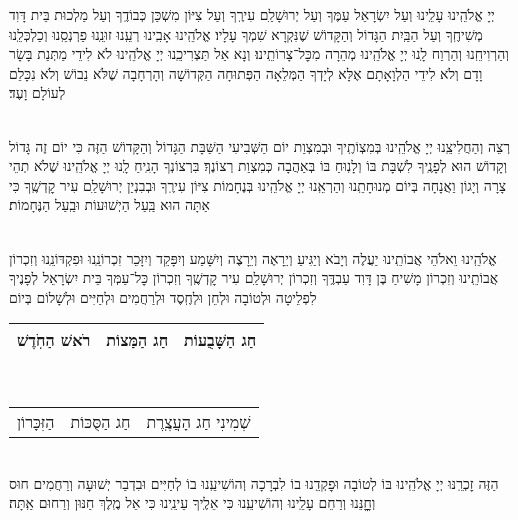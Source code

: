 \documentclass[twoside, openany, parskip=half, 11pt]{book}
\begin{document}
יְיָ אֱלֹהֵֽינוּ עָלֵֽינוּ וְעַל יִשְׂרָאֵל עַמֶּךָ וְעַל יְרוּשָׁלַ‍ִם עִירֶֽךָ וְעַל צִיּוֹן מִשְׁכַּן כְּבוֹדֶֽךָ וְעַל מַלְכוּת בֵּית דָּוִד מְשִׁיחֶֽךָ וְעַל הַבַּֽיִת הַגָּדוֹל וְהַקָּדוֹשׁ שֶׁנִּקְרָא שִׁמְךָ עָלָיו׃ אֱלֹהֵֽינוּ אָבִֽינוּ רְעֵֽנוּ זוּנֵֽנוּ פַרְנְסֵֽנוּ וְכַלְכְּלֵֽנוּ וְהַרְוִיחֵֽנוּ וְהַרְוַח לָֽנוּ יְיָ אֱלֹהֵֽינוּ מְהֵרָה מִכׇּל־צָרוֹתֵֽינוּ׃ וְנָא אַל תַּצְרִיכֵֽנוּ יְיָ אֱלֹהֵֽינוּ לֹא לִידֵי מַתְּנַת בָּשָׂר וָדָם וְלֹא לִידֵי הַלְוָאָתָם אֶלָּא לְיָדְךָ הַמְּלֵאָה הַפְּתוּחָה הַקְּדוֹשָׁה וְהָרְחָבָה שֶׁלֹּא נֵבוֹשׁ וְלֹא נִכָּלֵם לְעוֹלָם וָעֶד׃

\enlargethispage{\baselineskip}

\vspace{-.25\baselineskip}
\begin{sometimes}

\shabbos\\
רְצֵה וְהַחֲלִיצֵֽנוּ יְיָ אֱלֹהֵֽינוּ בְּמִצְוֹתֶֽיךָ וּבְמִצְוַת יוֹם הַשְּׁבִיעִי הַשַּׁבָּת הַגָּדוֹל וְהַקָּדוֹשׁ הַזֶּה כִּי יוֹם זֶה גָּדוֹל וְקָדוֹשׁ הוּא לְפָנֶֽיךָ לִשְׁבָּת בּוֹ וְלָנֽוּחַ בּוֹ בְּאַהֲבָה כְּמִצְוַת רְצוֹנֶךָ׃ בִּרְצוֹנְךָ הָנִֽיחַ לָֽנוּ יְיָ אֱלֹהֵֽינוּ שֶׁלֹא תְהֵי צָרָה וְיָגוֹן וַאֲנָחָה בְּיוֹם מְנוּחָתֵֽנוּ וְהַרְאֵֽנוּ יְיָ אֱלֹהֵֽינוּ בְּנֶחָמוֹת צִיּוֹן עִירֶֽךָ וּבְבִנְיַן יְרוּשָׁלַ‍ִם עִיר קׇדְשֶֽׁךָ כִּי אַתָּה הוּא בַּֽעַל הַיְשׁוּעוֹת וּבַֽעַל הַנֶּחָמוֹת׃


\sepline %

\vspace{-.25\baselineskip}
\\
אֱלֹהֵֽינוּ וֵאלֹהֵי אֲבוֹתֵֽינוּ יַעֲלֶה וְיָבֹא וְיַגִּיעַ וְיֵרָאֶה וְיֵרָצֶה וְיִשָּׁמַע וְיִפָּקֵד וְיִזָּכֵר זִכְרוֹנֵֽנוּ וּפִקְדּוֹנֵֽנוּ וְזִכְרוֹן אֲבוֹתֵֽינוּ וְזִכְרוֹן מָשִׁיחַ בֶּן דָּוִד עַבְדֶּֽךָ וְזִכְרוֹן יְרוּשָׁלַ‍ִם עִיר קׇדְשֶֽׁךָ וְזִכְרוֹן כׇּל־עַמְּךָ בֵּית יִשְׂרָאֵל לְפָנֶיךָ לִפְלֵיטָה וּלְטוֹבָה וּלְחֵן וּלְחֶֽסֶד וּלְרַחֲמִים וּלְחַיִּים וּלְשָׁלוֹם בְּיוֹם\\
\begin{tabular}{c|c|c}
רֹאשׁ הַחֹֽדֶשׁ & חַג הַמַּצוֹת & חַג הַשָּׁבֻעוֹת\\ \hline
\end{tabular}\\
\begin{tabular}{c|c|c}
הַזִּכָּרוֹן & חַג הַסֻּכּוֹת & שְׁמִינִי חַג הָעֲצֶֽרֶת
\end{tabular}\\
הַזֶּה זׇכְרֵֽנּוּ יְיָ אֱלֹהֵֽינוּ בּוֹ לְטוֹבָה וּפׇקְדֵֽנוּ בוֹ לִבְרָכָה וְהוֹשִׁיעֵֽנוּ בוֹ לְחַיִּים וּבִדְבַר יְשׁוּעָה וְרַחֲמִים חוּס וְחׇׇׇׇנֵּנוּ וְרַחֵם עָלֵֽינוּ וְהוֹשִׁיעֵֽנוּ כִּי אֵלֶֽיךָ עֵינֵֽינוּ כִּי אֵל מֶֽלֶךְ חַנּוּן וְרַחוּם אַֽתָּה׃

\end{sometimes}
\end{document}
